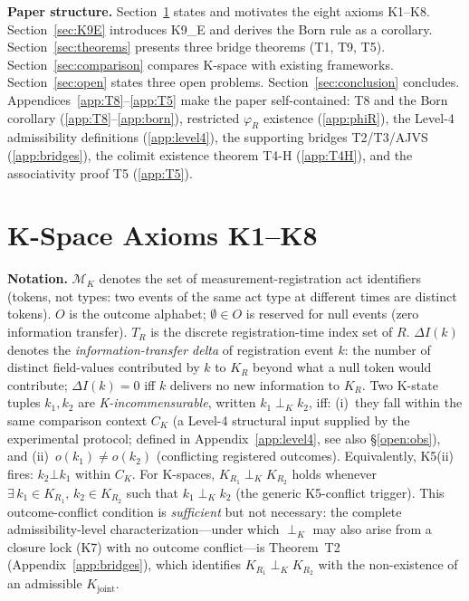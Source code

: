 \documentclass[12pt,a4paper]{article}
\theoremstyle{plain}
\theoremstyle{definition}
\theoremstyle{remark}
\newcommand{\KR}{K_{\!R}}
\newcommand{\Kjoint}{K_{\mathrm{joint}}}
\newcommand{\CK}{C_K}
\newcommand{\DI}{\Delta I}
\begin{document}
\medskip\noindent
\textbf{Paper structure.}
Section~\ref{sec:axioms} states and motivates the eight axioms K1--K8.
Section~\ref{sec:K9E} introduces K9\_E and derives the Born rule as a
corollary.
Section~\ref{sec:theorems} presents three bridge theorems (T1, T9, T5).
Section~\ref{sec:comparison} compares K-space with existing frameworks.
Section~\ref{sec:open} states three open problems.
Section~\ref{sec:conclusion} concludes.
Appendices~\ref{app:T8}--\ref{app:T5} make the paper self-contained: T8 and the
Born corollary (\ref{app:T8}--\ref{app:born}), restricted $\varphi_R$ existence
(\ref{app:phiR}), the Level-4 admissibility definitions (\ref{app:level4}),
the supporting bridges T2/T3/AJVS (\ref{app:bridges}), the colimit existence
theorem T4-H (\ref{app:T4H}), and the associativity proof T5 (\ref{app:T5}).

\section{K-Space Axioms K1--K8}
\label{sec:axioms}

\noindent\textbf{Notation.}
$\mathcal{M}_K$ denotes the set of measurement-registration act identifiers
(tokens, not types: two events of the same act type at different times are
distinct tokens). $O$ is the outcome alphabet; $\emptyset\in O$ is reserved
for null events (zero information transfer). $T_R$ is the discrete
registration-time index set of $R$.
$\DI(k)$ denotes the \emph{information-transfer delta} of registration
event $k$: the number of distinct field-values contributed by $k$ to
$\KR$ beyond what a null token would contribute; $\DI(k)=0$ iff $k$
delivers no new information to $\KR$.
Two K-state tuples $k_1,k_2$ are \emph{K-incommensurable}, written
$k_1\perp_K k_2$, iff: (i)~they fall within the same comparison
context $\CK$ (a Level-4 structural input supplied by the experimental
protocol; defined in Appendix~\ref{app:level4}, see also \S\ref{open:obs}),
and (ii)~$o(k_1)\neq o(k_2)$
(conflicting registered outcomes). Equivalently, K5(ii) fires:
$k_2\bot k_1$ within $\CK$. For K-spaces,
$K_{R_1}\perp_K K_{R_2}$ holds whenever $\exists\,k_1\in K_{R_1},\,k_2\in K_{R_2}$
such that $k_1\perp_K k_2$ (the generic K5-conflict trigger). This
outcome-conflict condition is \emph{sufficient} but not necessary: the
complete admissibility-level characterization---under which $\perp_K$ may also
arise from a closure lock (K7) with no outcome conflict---is Theorem~T2
(Appendix~\ref{app:bridges}), which identifies $K_{R_1}\perp_K K_{R_2}$ with
the non-existence of an admissible $\Kjoint$.
\end{document}
